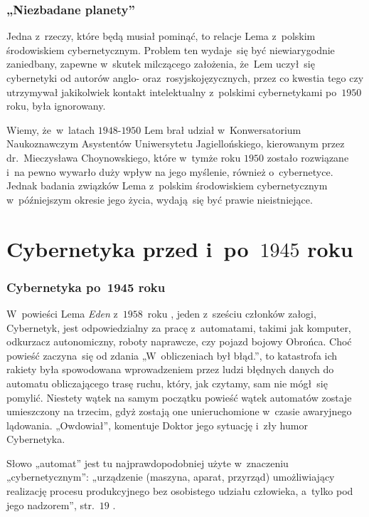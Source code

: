 \documentclass[10pt,t]{beamer}
\begin{document}
\begin{frame}
  \frametitle{„Niezbadane planety”}


  Jedna z~rzeczy, które będą musiał pominąć, to relacje Lema z~polskim
  środowiskiem cybernetycznym. Problem ten wydaje~się być niewiarygodnie
  zaniedbany, zapewne w~skutek milczącego założenia, że~Lem uczył~się
  cybernetyki od autorów anglo- oraz~rosyjskojęzycznych, przez co
  kwestia tego czy utrzymywał jakikolwiek kontakt intelektualny
  z~polskimi cybernetykami po~$1950$ roku, była ignorowany.

  Wiemy, że~w~latach $1948\text{-}1950$ Lem brał udział w~Konwersatorium
  Naukoznawczym Asystentów Uniwersytetu Jagiellońskiego, kierowanym
  przez
  {dr.~Mieczysława Choynowskiego}, które w~tymże roku $1950$ zostało
  rozwiązane i~na pewno wywarło duży wpływ na jego myślenie,
  również o~cybernetyce. Jednak badania związków Lema z~polskim środowiskiem
  cybernetycznym w~późniejszym okresie jego życia, wydają~się być prawie
  nieistniejące.

\end{frame}









\section{Cybernetyka przed i~po~$1945$ roku}


\begin{frame}
  \frametitle{Cybernetyka po~1945 roku}


  W~powieści Lema \textit{Eden} z~$1958$~roku
  \parencite{Lem-Eden-Pub-2019}, jeden z~sześciu członków
  załogi, Cybernetyk, jest odpowiedzialny za pracę z~automatami, takimi
  jak komputer, odkurzacz autonomiczny, roboty naprawcze, czy pojazd bojowy
  Obrońca. Choć powieść zaczyna~się od zdania „W~obliczeniach był błąd.”,
  to katastrofa ich rakiety była spowodowana wprowadzeniem przez ludzi
  błędnych danych do automatu obliczającego trasę ruchu, który, jak
  czytamy, sam nie mógł~się pomylić. Niestety wątek na samym początku
  powieść wątek automatów zostaje umieszczony na trzecim, gdyż zostają one
  unieruchomione w~czasie awaryjnego lądowania. „Owdowiał”, komentuje
  Doktor jego sytuację i~zły humor Cybernetyka.

  Słowo „automat” jest tu najprawdopodobniej użyte w~znaczeniu
  „cybernetycznym”: „urządzenie (maszyna, aparat, przyrząd)
  umożliwiający realizację procesu produkcyjnego bez osobistego udziału
  człowieka, a~tylko pod jego nadzorem”, str.~$19$
  \parencite{Szylejko-Szylejko-Cybernetyka-bez-matematyki-Pub-1977}.

\end{frame}
\end{document}
